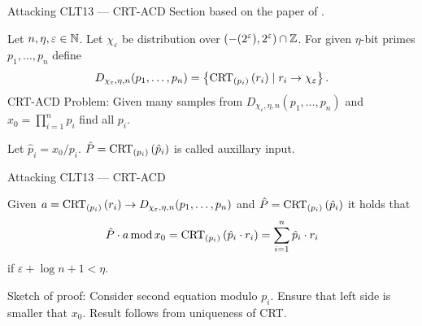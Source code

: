 \documentclass[english]{beamer}
\begin{document}
    \begin{frame}{Attacking CLT13 --- CRT-ACD}
        Section based on the paper of .
        \begin{definition}
            Let $n, \eta, \varepsilon \in \mathbb{N}$. Let $\chi_\varepsilon$ be distribution over $(-(2^\varepsilon), 2^\varepsilon) \cap \mathbb{Z}$. For given $\eta$-bit primes $p_1, \dots, p_n$ define
            \begin{equation*}
                D_{\chi_\varepsilon, \eta, n}(p_1, \dots, p_n) = \left\lbrace \operatorname{CRT}_{(p_{i})}\left(r_i\right) \mid r_i \rightarrow \chi_\varepsilon \right\rbrace.
            \end{equation*}
            CRT-ACD Problem: Given many samples from $D_{\chi_\varepsilon, \eta, n}(p_1, \dots, p_n)$ and $x_0 = \prod_{i=1}^n p_i$ find all $p_i$.
        \end{definition}
        \pause

        Let $\hat{p}_i = x_0 / p_i$. $\hat{P} = \operatorname{CRT}_{(p_{i})}\left(\hat{p}_i\right)$ is called auxillary input.
    \end{frame}
    \begin{frame}{Attacking CLT13 --- CRT-ACD}
        \begin{lemma}
            Given $a = \operatorname{CRT}_{(p_{i})}\left(r_i\right) \rightarrow D_{\chi_\varepsilon, \eta, n}(p_1, \dots, p_n)$ and $\hat{P} = \operatorname{CRT}_{(p_{i})}\left(\hat{p}_i\right)$ it holds that
            \begin{equation*}
                \hat{P} \cdot a \operatorname{mod} x_0 = \operatorname{CRT}_{(p_{i})}\left(\hat{p}_i \cdot r_i\right) = \sum_{i=1}^n \hat{p}_i \cdot r_i
            \end{equation*}
            if $\varepsilon + \log n + 1 < \eta$.
        \end{lemma}
        \pause
        Sketch of proof: Consider second equation modulo $p_i$. Ensure that left side is smaller that $x_0$. Result follows from uniqueness of CRT.
    \end{frame}
\end{document}
